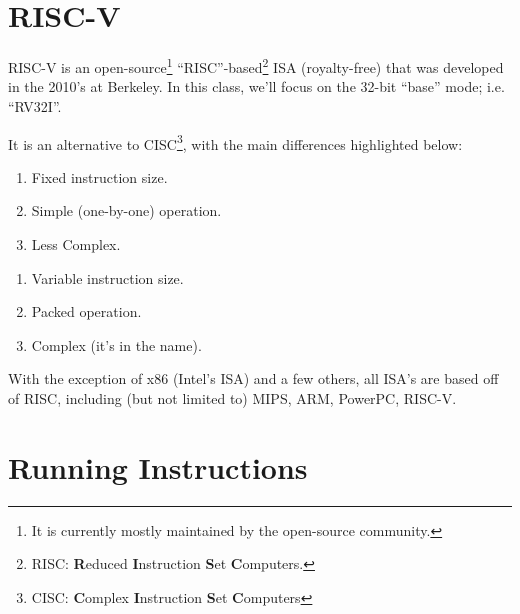 \documentclass{report}
\newcommand{\corollary}[2]{\begin{tcolorbox}[colback=teal!5!white,colframe=black!75!teal,title={Corollary:
      #1}]{#2}\end{tcolorbox}}
\begin{document}
  

\section{RISC-V}
RISC-V is an open-source\footnote{It is currently mostly maintained by the open-source community.}
``RISC''-based\footnote{RISC: \textbf{R}educed \textbf{I}nstruction \textbf{S}et
  \textbf{C}omputers.}  ISA (royalty-free) that was developed in the 2010's at Berkeley. In this
class, we'll focus on the 32-bit ``base'' mode; i.e. ``RV32I''.

It is an alternative to CISC\footnote{CISC: \textbf{C}omplex
  \textbf{I}nstruction \textbf{S}et \textbf{C}omputers}, with the main
differences highlighted below:

\begin{tcbraster}[raster columns=2, raster equal height, raster force size=false]
  \begin{tcolorbox}[colback=teal!5!white,colframe=black!50!violet,title=RISC]
    \begin{enumerate}[label=\textit{(\roman*)}]
    \item Fixed instruction size.
    \item Simple (one-by-one) operation.
    \item Less Complex.
    \end{enumerate}
  \end{tcolorbox}
  \begin{tcolorbox}[colback=yellow!5!white,colframe=black!50!orange,title=CISC]
    \begin{enumerate}[label=\textit{(\roman*)}]
    \item Variable instruction size.
    \item Packed operation.
    \item Complex (it's in the name).
    \end{enumerate}
  \end{tcolorbox}
\end{tcbraster}

\corollary{Widely Used}{
  With the exception of x86 (Intel's ISA) and a few others, all ISA's are based off of RISC, including
  (but not limited to) MIPS, ARM, PowerPC, RISC-V.
}





\section{Running Instructions}
\end{document}
